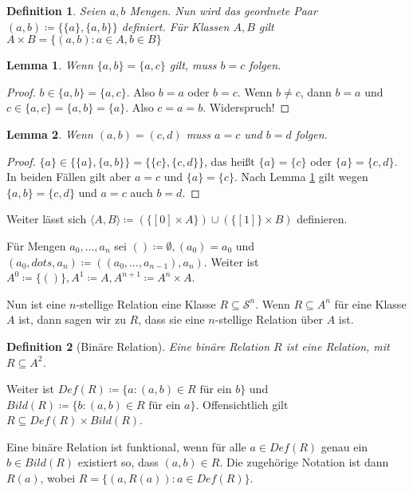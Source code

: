 \documentclass[german]{article}
\theoremstyle{break}
\theoremstyle{def_style}
\newtheorem{definition}{Definition}[section]
\theoremstyle{def_style}
\theoremstyle{lemma_style}
\newtheorem{lemma}{Lemma}[subsection]
\begin{document}
\begin{definition}
	Seien $a, b$ Mengen. Nun wird das geordnete Paar $(a, b)\coloneqq\{\{a\}, \{a,b\}\}$ definiert. Für Klassen $A,B$ gilt $A\times B=\{(a,b):a\in A, b\in B\}$
\end{definition}

\begin{lemma}
	Wenn $\{a,b\}=\{a,c\}$ gilt, muss $b=c$ folgen.
	\label{ZweierMengenMitEinemUnterschied}
\end{lemma}
\begin{proof}
	$b\in \{a,b\}=\{a,c\}$. Also $b=a$ oder $b=c$. Wenn $b\neq c$, dann $b=a$ und $c\in\{a,c\}=\{a,b\}=\{a\}$. Also $c=a=b$. Widerspruch!
\end{proof}

\begin{lemma}
	Wenn $(a,b)=(c,d)$ muss $a=c$ und $b=d$ folgen.
\end{lemma}
\begin{proof}
	$\{a\}\in \{\{a\}, \{a,b\}\}=\{\{c\},\{c,d\}\}$, das heißt $\{a\}=\{c\}$ oder $\{a\}=\{c,d\}$. In beiden Fällen gilt aber $a=c$ und $\{a\}=\{c\}$. Nach Lemma \ref{ZweierMengenMitEinemUnterschied} gilt wegen $\{a,b\}=\{c,d\}$ und $a=c$ auch $b=d$.
\end{proof}

Weiter lässt sich $\langle A, B \rangle\coloneqq(\{[0]\times A\})\cup(\{[1]\}\times B)$ definieren.

Für Mengen $a_0,\dots,a_n$ sei $()\coloneqq \emptyset, (a_0)=a_0$ und $(a_0,dots,a_n)\coloneqq((a_0,\dots,a_{n-1}), a_n)$.
Weiter ist $A^0\coloneqq\{()\}, A^1\coloneqq A, A^{n+1}\coloneqq A^n\times A$.

Nun ist eine $n$-stellige Relation eine Klasse $R\subseteq \mathcal{S}^n$. Wenn $R\subseteq A^n$ für eine Klasse $A$ ist, dann sagen wir zu $R$, dass sie eine $n$-stellige Relation über $A$ ist.

\begin{definition}[Binäre Relation]
	Eine \textit{binäre Relation} $R$ ist eine Relation, mit $R\subseteq A^2$.
\end{definition}

Weiter ist $Def(R)\coloneqq\{a : (a,b)\in R \text{ für ein } b\}$ und $Bild(R)\coloneqq \{b : (a,b)\in R \text{ für ein } a\}$. Offensichtlich gilt $R\subseteq Def(R)\times Bild(R)$.

Eine binäre Relation ist funktional, wenn für alle $a\in Def(R)$ genau ein $b\in Bild(R)$ existiert so, dass $(a,b)\in R$. Die zugehörige Notation ist dann $R(a)$, wobei $R=\{(a,R(a)) : a \in Def(R)\}$.
\end{document}
